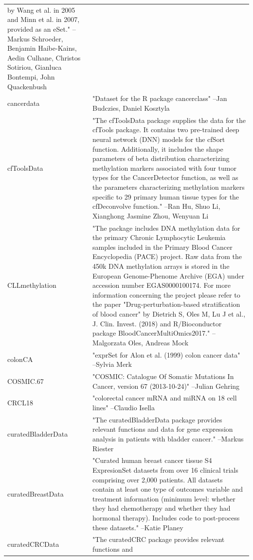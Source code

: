 \documentclass[]{article}
\begin{document}
\begin{longtable}[t]{l>{\raggedright\arraybackslash}p{25em}}
by Wang et al. in 2005 and Minn et al. in 2007, provided as an
eSet." --Markus Schroeder, Benjamin Haibe-Kains, Aedin Culhane, Christos Sotiriou, Gianluca Bontempi, John Quackenbush\\
cancerdata & "Dataset for the R package cancerclass" --Jan Budczies, Daniel Kosztyla\\
cfToolsData & "The cfToolsData package supplies the data for the cfTools
package. It contains two pre-trained deep neural network (DNN)
models for the cfSort function. Additionally, it includes the
shape parameters of beta distribution characterizing
methylation markers associated with four tumor types for the
CancerDetector function, as well as the parameters
characterizing methylation markers specific to 29 primary human
tissue types for the cfDeconvolve function." --Ran Hu, Shuo Li, Xianghong Jasmine Zhou, Wenyuan Li\\
\addlinespace
CLLmethylation & "The package includes DNA methylation data for the primary
Chronic Lymphocytic Leukemia samples included in the Primary
Blood Cancer Encyclopedia (PACE) project. Raw data from the
450k DNA methylation arrays is stored in the European
Genome-Phenome Archive (EGA) under accession number
EGAS0000100174. For more information concerning the project
please refer to the paper "Drug-perturbation-based
stratification of blood cancer" by Dietrich S, Oles M, Lu J et
al., J. Clin. Invest. (2018) and R/Bioconductor package
BloodCancerMultiOmics2017." --Malgorzata Oles, Andreas Mock\\
colonCA & "exprSet for Alon et al. (1999) colon cancer data" --Sylvia Merk\\
COSMIC.67 & "COSMIC: Catalogue Of Somatic Mutations In Cancer, version
67 (2013-10-24)" --Julian Gehring\\
CRCL18 & "colorectal cancer mRNA and miRNA on 18 cell lines" --Claudio Isella\\
curatedBladderData & "The curatedBladderData package provides relevant functions
and data for gene expression analysis in patients with bladder
cancer." --Markus Riester\\
\addlinespace
curatedBreastData & "Curated human breast cancer tissue S4 ExpresionSet
datasets from over 16 clinical trials comprising over 2,000
patients. All datasets contain at least one type of outcomes
variable and treatment information (minimum level: whether they
had chemotherapy and whether they had hormonal therapy).
Includes code to post-process these datasets." --Katie Planey\\
curatedCRCData & "The curatedCRC package provides relevant functions and

\end{longtable}
\end{document}
